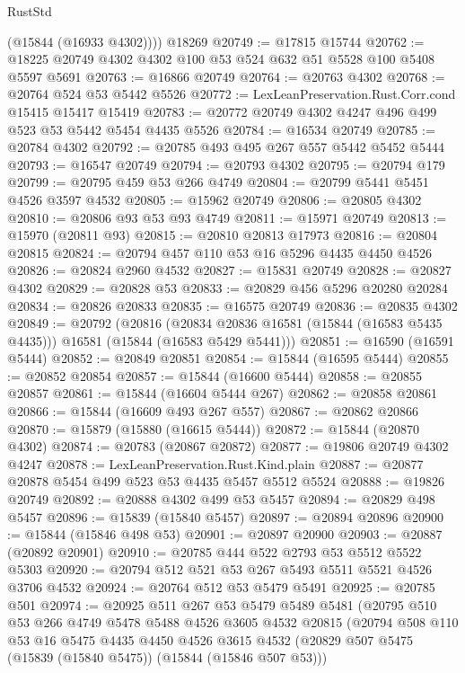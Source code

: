 \begin{lexlean}{RustStd}
\begin{coremodule}
        (@15844 (@16933 @4302))))
    @18269
@20749 := @17815 @15744
@20762 := @18225 @20749 @4302 @4302 @100 @53 @524 @632 @51 @5528 @100 @5408 @5597 @5691
@20763 := @16866 @20749
@20764 := @20763 @4302
@20768 := @20764 @524 @53 @5442 @5526
@20772 := LexLeanPreservation.Rust.Corr.cond @15415 @15417 @15419
@20783 := @20772 @20749 @4302 @4247 @496 @499 @523 @53 @5442 @5454 @4435 @5526
@20784 := @16534 @20749
@20785 := @20784 @4302
@20792 := @20785 @493 @495 @267 @557 @5442 @5452 @5444
@20793 := @16547 @20749
@20794 := @20793 @4302
@20795 := @20794 @179
@20799 := @20795 @459 @53 @266 @4749
@20804 := @20799 @5441 @5451 @4526 @3597 @4532
@20805 := @15962 @20749
@20806 := @20805 @4302
@20810 := @20806 @93 @53 @93 @4749
@20811 := @15971 @20749
@20813 := @15970 (@20811 @93)
@20815 := @20810 @20813 @17973
@20816 := @20804 @20815
@20824 := @20794 @457 @110 @53 @16 @5296 @4435 @4450 @4526
@20826 := @20824 @2960 @4532
@20827 := @15831 @20749
@20828 := @20827 @4302
@20829 := @20828 @53
@20833 := @20829 @456 @5296 @20280 @20284
@20834 := @20826 @20833
@20835 := @16575 @20749
@20836 := @20835 @4302
@20849 := @20792
    (@20816
      (@20834 @20836 @16581 (@15844 (@16583 @5435 @4435)))
      @16581
      (@15844 (@16583 @5429 @5441)))
@20851 := @16590 (@16591 @5444)
@20852 := @20849 @20851
@20854 := @15844 (@16595 @5444)
@20855 := @20852 @20854
@20857 := @15844 (@16600 @5444)
@20858 := @20855 @20857
@20861 := @15844 (@16604 @5444 @267)
@20862 := @20858 @20861
@20866 := @15844 (@16609 @493 @267 @557)
@20867 := @20862 @20866
@20870 := @15879 (@15880 (@16615 @5444))
@20872 := @15844 (@20870 @4302)
@20874 := @20783 (@20867 @20872)
@20877 := @19806 @20749 @4302 @4247
@20878 := LexLeanPreservation.Rust.Kind.plain
@20887 := @20877 @20878 @5454 @499 @523 @53 @4435 @5457 @5512 @5524
@20888 := @19826 @20749
@20892 := @20888 @4302 @499 @53 @5457
@20894 := @20829 @498 @5457
@20896 := @15839 (@15840 @5457)
@20897 := @20894 @20896
@20900 := @15844 (@15846 @498 @53)
@20901 := @20897 @20900
@20903 := @20887 (@20892 @20901)
@20910 := @20785 @444 @522 @2793 @53 @5512 @5522 @5303
@20920 := @20794 @512 @521 @53 @267 @5493 @5511 @5521 @4526 @3706 @4532
@20924 := @20764 @512 @53 @5479 @5491
@20925 := @20785 @501
@20974 := @20925
    @511
    @267
    @53
    @5479
    @5489
    @5481
    (@20795
      @510
      @53
      @266
      @4749
      @5478
      @5488
      @4526
      @3605
      @4532
      @20815
      (@20794
        @508
        @110
        @53
        @16
        @5475
        @4435
        @4450
        @4526
        @3615
        @4532
        (@20829 @507 @5475 (@15839 (@15840 @5475)) (@15844 (@15846 @507 @53)))

\end{coremodule}
\end{lexlean}
